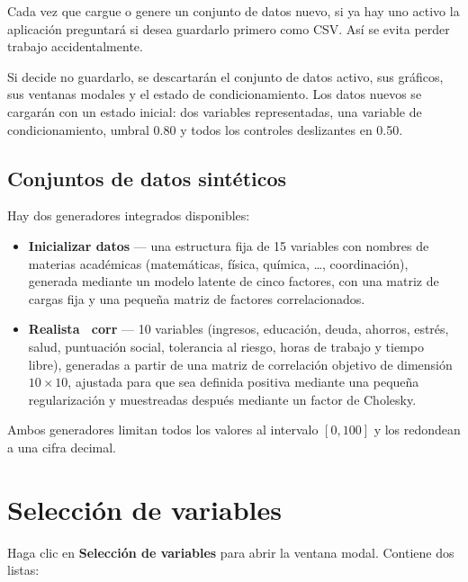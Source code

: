 \documentclass[11pt,a4paper]{article}
\begin{document}
Cada vez que cargue o genere un conjunto de datos nuevo, si ya hay uno activo la aplicación preguntará si desea guardarlo primero como CSV. Así se evita perder trabajo accidentalmente.

\begin{warnbox}
Si decide no guardarlo, se descartarán el conjunto de datos activo, sus gráficos, sus ventanas modales y el estado de condicionamiento. Los datos nuevos se cargarán con un estado inicial: dos variables representadas, una variable de condicionamiento, umbral 0.80 y todos los controles deslizantes en 0.50.
\end{warnbox}

\subsection{Conjuntos de datos sintéticos}

Hay dos generadores integrados disponibles:

\begin{itemize}[leftmargin=1.4em]
  \item \textbf{Inicializar datos} --- una estructura fija de 15 variables con nombres de materias académicas (matemáticas, física, química, \dots, coordinación), generada mediante un modelo latente de cinco factores, con una matriz de cargas fija y una pequeña matriz de factores correlacionados.
  \item \textbf{Realista \textpm\ corr} --- 10 variables (ingresos, educación, deuda, ahorros, estrés, salud, puntuación social, tolerancia al riesgo, horas de trabajo y tiempo libre), generadas a partir de una matriz de correlación objetivo de dimensión $10\times10$, ajustada para que sea definida positiva mediante una pequeña regularización y muestreadas después mediante un factor de Cholesky.
\end{itemize}

Ambos generadores limitan todos los valores al intervalo $[0,100]$ y los redondean a una cifra decimal.

\section{Selección de variables}

Haga clic en \textbf{Selección de variables} para abrir la ventana modal. Contiene dos listas:
\end{document}
